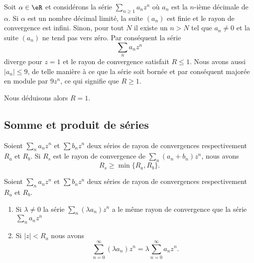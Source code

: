 \begin{example}
    Soit \( \alpha\in \eR\) et considérons la série \( \sum_{n\geq 1}a_nz^n\) où \( a_n\) est la \( n\)-ième décimale de \( \alpha\). Si \( \alpha\) est un nombre décimal limité, la suite \( (a_n)\) est finie et le rayon de convergence est infini. Sinon, pour tout \( N\) il existe un \( n>N\) tel que \( a_n\neq 0\) et la suite \( (a_n)\) ne tend pas vers zéro. Par conséquent la série
    \begin{equation}
        \sum_{n}a_nz^n
    \end{equation}
    diverge pour \( z=1\) et le rayon de convergence satisfait \( R\leq 1\). Nous avons aussi \( | a_n |\leq 9\), de telle manière à ce que la série soit bornée et par conséquent majorée en module par \( 9z^n\), ce qui signifie que \( R\geq 1\).

    Nous déduisons alors \( R=1\).
\end{example}

\subsection{Somme et produit de séries}

\begin{theorem}\label{THOooSDQQooIawBOk}
    Soient \( \sum_na_nz^n\) et \( \sum b_nz^n\) deux séries de rayon de convergences respectivement \( R_a\) et \( R_b\).  Si \( R_s\) est le rayon de convergence de \( \sum_n(a_n+b_n)z^n\), nous avons
    \begin{equation}
        R_s\geq \min\{ R_a,R_b \}.
    \end{equation}
\end{theorem}

\begin{theorem}     \label{THOooINHDooZxErnp}
    Soient \( \sum_na_nz^n\) et \( \sum b_nz^n\) deux séries de rayon de convergences respectivement \( R_a\) et \( R_b\).  
    \begin{enumerate}
        \item
            Si \( \lambda\neq 0\) la série \( \sum_n(\lambda a_n)z^n\) a le même rayon de convergence que la série \( \sum_na_nz^n\) 
        \item
            Si \( | z |<R_a\) nous avons
    \begin{equation}
        \sum_{n=0}^{\infty}(\lambda a_n)z^n=\lambda\sum_{n=0}^{\infty}a_nz^n.
    \end{equation}
    \end{enumerate}
\end{theorem}


